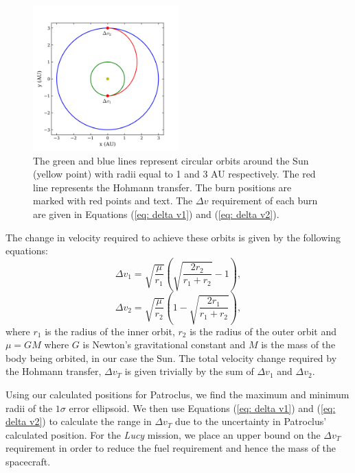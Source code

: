 \documentclass[10pt, twocolumn]{revtex4}    %
\begin{document}
\begin{figure}[h!]
\centering
\includegraphics[width=0.5\textwidth]{20180410_200052_HOHMANN_TRANSFER_EXAMPLE}
\caption{The green and blue lines represent circular orbits around the Sun (yellow point) with radii equal to 1 and 3 AU respectively. The red line represents the Hohmann transfer. The burn positions are marked with red points and text. The $\Delta v$ requirement of each burn are given in Equations (\ref{eq: delta v1}) and (\ref{eq: delta v2}).}
\label{fig: hohmann trasnfer}
\end{figure}

The change in velocity required to achieve these orbits is given by the following equations:
\begin{equation} \label{eq: delta v1}
\Delta v_1 = \sqrt{\frac{\mu}{r_1}}\left( \sqrt{\frac{2r_2}{r_1+r_2}}-1 \right),
\end{equation} 
\begin{equation} \label{eq: delta v2}
\Delta v_2 = \sqrt{\frac{\mu}{r_2}}\left( 1- \sqrt{\frac{2r_1}{r_1+r_2}} \right),
\end{equation} 
where $r_1$ is the radius of the inner orbit, $r_2$ is the radius of the outer orbit and $\mu = GM$ where $G$ is Newton's gravitational constant and $M$ is the mass of the body being orbited, in our case the Sun. The total velocity change required by the Hohmann transfer, $\Delta v_{T}$ is given trivially by the sum of $\Delta v_1$ and $\Delta v_2$.

Using our calculated positions for Patroclus, we find the maximum and minimum radii of the $1\sigma$ error ellipsoid. We then use Equations (\ref{eq: delta v1}) and (\ref{eq: delta v2}) to calculate the range in $\Delta v_{T}$ due to the uncertainty in Patroclus' calculated position. For the \textit{Lucy} mission, we place an upper bound on the $\Delta v_{T}$ requirement in order to reduce the fuel requirement and hence the mass of the spacecraft.
\end{document}
